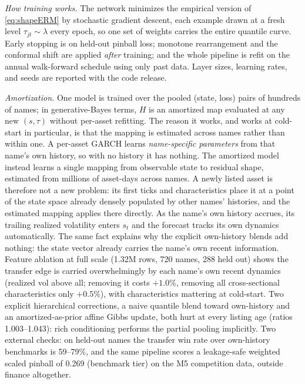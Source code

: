 \documentclass[11pt]{article}
\theoremstyle{remark}
\begin{document}
\emph{How training works.} The network minimizes the empirical version
of \eqref{eq:shapeERM} by stochastic gradient descent, each example
drawn at a fresh level $\tau_{jt}\sim\lambda$ every epoch, so one set of
weights carries the entire quantile curve. Early stopping is on
held-out pinball loss; monotone rearrangement and the conformal shift
are applied \emph{after} training; and the whole pipeline is refit on
the annual walk-forward schedule using only past data. Layer sizes,
learning rates, and seeds are reported with the code release.

\emph{Amortization.} One model is trained over the pooled (state, loss)
pairs of hundreds of names; in generative-Bayes terms, $H$ is an
amortized map evaluated at any new $(s,\tau)$ without per-asset
refitting. The reason it works, and works at cold-start in particular, is that the
mapping is estimated across names rather than within one. A per-asset
GARCH learns \emph{name-specific parameters} from that name's own
history, so with no history it has nothing. The amortized model instead
learns a single mapping from observable state to residual shape,
estimated from millions of asset-days across names. A newly listed asset
is therefore not a new problem: its first ticks and characteristics place
it at a point of the state space already densely populated by other
names' histories, and the estimated mapping applies there directly. As
the name's own history accrues, its trailing realized volatility enters
$s_t$ and the forecast tracks its own dynamics automatically. The same
fact explains why the explicit own-history blends add nothing: the state
vector already carries the name's own recent information. Feature ablation at full scale (1.32M rows, 720 names, 288
held out) shows the transfer edge is carried overwhelmingly by each
name's own recent dynamics (realized vol above all; removing it
costs $+1.0\%$, removing all cross-sectional characteristics only
$+0.5\%$), with characteristics mattering at cold-start. Two explicit hierarchical corrections, a naive quantile blend toward
own-history and an amortized-as-prior affine Gibbs update, both
hurt at every listing age (ratios 1.003--1.043): rich
conditioning performs the partial pooling implicitly. Two external checks: on held-out names the
transfer win rate over own-history benchmarks is 59--79\%, and the same
pipeline scores a leakage-safe weighted scaled pinball of 0.269
(benchmark tier) on the M5 competition data, outside finance
altogether.
\end{document}
